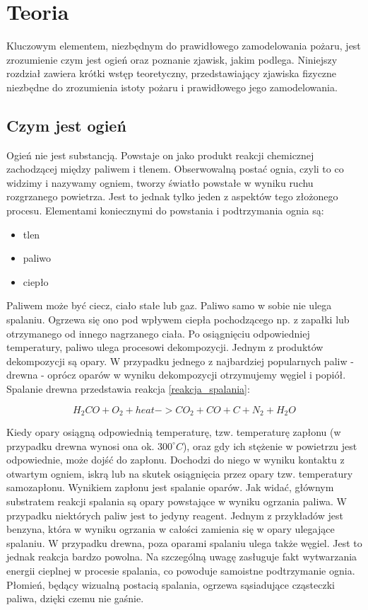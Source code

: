 ﻿%
\chapter{Teoria}
\label{cha:Teoria}
Kluczowym elementem, niezbędnym do prawidłowego zamodelowania pożaru,
jest zrozumienie czym jest ogień oraz poznanie zjawisk, jakim podlega. Niniejszy rozdział zawiera
krótki wstęp teoretyczny, przedstawiający zjawiska fizyczne niezbędne do zrozumienia istoty 
pożaru i prawidłowego jego zamodelowania.
\section {Czym jest ogień}
Ogień nie jest substancją. Powstaje on jako produkt reakcji chemicznej zachodzącej między paliwem i tlenem.
Obserwowalną postać ognia, czyli to co widzimy i nazywamy ogniem, tworzy światło powstałe w wyniku ruchu rozgrzanego powietrza.
Jest to jednak tylko jeden z aspektów tego złożonego procesu.
Elementami koniecznymi do powstania i podtrzymania ognia są:
\begin{itemize}
\item tlen
\item paliwo
\item ciepło
\end{itemize}


Paliwem może być ciecz, ciało stałe lub gaz. Paliwo samo w sobie nie ulega spalaniu. Ogrzewa się ono pod wpływem ciepła
pochodzącego np. z zapałki lub otrzymanego od innego nagrzanego ciała. Po osiągnięciu
odpowiedniej temperatury, paliwo ulega procesowi dekompozycji. Jednym z produktów dekompozycji
są opary. W przypadku jednego z najbardziej popularnych paliw - drewna - oprócz oparów w wyniku dekompozycji otrzymujemy węgiel i popiół.
Spalanie drewna przedstawia reakcja \ref{reakcja_spalania}:

\begin {equation}
H_2CO+O_2 + heat ->CO_2 + CO+ C + N_2 + H_2O
\label {reakcja_spalania}
\end {equation}

Kiedy opary osiągną odpowiednią temperaturę, tzw. temperaturę zapłonu (w przypadku drewna wynosi ona ok. $300^\circ C$), oraz gdy ich stężenie
w powietrzu jest odpowiednie, może dojść do zapłonu. Dochodzi do niego w wyniku kontaktu z otwartym ogniem, iskrą lub na skutek osiągnięcia
przez opary tzw. temperatury samozapłonu. Wynikiem zapłonu jest spalanie oparów. Jak widać, głównym substratem reakcji spalania są opary powstające w wyniku
ogrzania paliwa. W przypadku niektórych paliw jest to jedyny reagent. Jednym z przykładów jest benzyna, która w wyniku ogrzania w całości zamienia się w opary ulegające spalaniu. W przypadku drewna, poza oparami spalaniu ulega także węgiel. Jest to jednak reakcja bardzo powolna.
Na szczególną uwagę zasługuje fakt wytwarzania energii cieplnej w procesie spalania, co powoduje samoistne podtrzymanie ognia. Płomień, będący
wizualną postacią spalania, ogrzewa sąsiadujące cząsteczki paliwa, dzięki czemu nie gaśnie.

